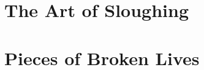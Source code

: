 \documentclass[12pt]{book}
\begin{document}



\chapter{The Art of Sloughing} %

\chapter{Pieces of Broken Lives} %

\chapter{}
\end{document}
